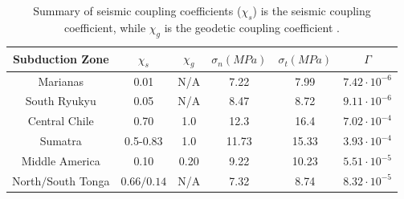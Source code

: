 \documentclass[12pt]{article}
\begin{document}
{   \begin{table}[H]
  \caption{Summary of seismic coupling coefficients ($\chi_s$) is the seismic coupling coefficient, while $\chi_g$ is the geodetic coupling coefficient \citep{scholz2012seismic}.} %
  \centering  %
  \begin{tabular}{c c c c c c} %
    \hline \hline                        %
    Subduction Zone & $\chi_s$ & $\chi_g$ & $\sigma_n (MPa)$ & $\sigma_t (MPa)$ & $\Gamma$ \\ [0.5ex] %
    \hline                  %
    Marianas &0.01 &N/A &7.22 &7.99 & $7.42 \cdot 10^{-6}$\\
    South Ryukyu  &0.05 &N/A &8.47&8.72 & $9.11 \cdot 10^{-6}$\\
    Central Chile &0.70 &1.0 &12.3 &16.4 & $7.02 \cdot 10^{-4}$ \\
    Sumatra &0.5-0.83 &1.0 &11.73 & 15.33 &$3.93 \cdot 10^{-4}$\\
    Middle America &0.10 &0.20 &9.22 & 10.23 & $5.51 \cdot 10^{-5}$ \\
    North$/$South Tonga & $0.66/0.14$ &N/A &7.32 & 8.74 & $8.32 \cdot 10^{-5}$ \\
    \hline %
  \end{tabular}
  \label{table:coupling_summary} %
\end{table}

}
\end{document}

